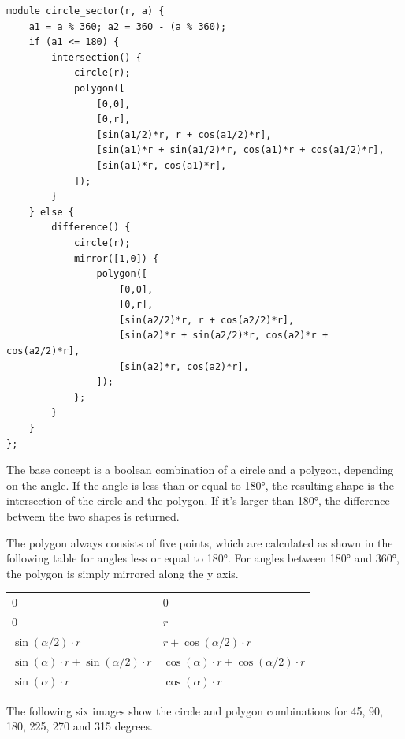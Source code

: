 \vspace{.5\baselineskip}
\begin{verbatim}
module circle_sector(r, a) {
    a1 = a % 360; a2 = 360 - (a % 360);
    if (a1 <= 180) {
        intersection() {
            circle(r);
            polygon([
                [0,0],
                [0,r],
                [sin(a1/2)*r, r + cos(a1/2)*r],
                [sin(a1)*r + sin(a1/2)*r, cos(a1)*r + cos(a1/2)*r],
                [sin(a1)*r, cos(a1)*r],
            ]);
        }
    } else {
        difference() {
            circle(r);
            mirror([1,0]) {
                polygon([
                    [0,0],
                    [0,r],
                    [sin(a2/2)*r, r + cos(a2/2)*r],
                    [sin(a2)*r + sin(a2/2)*r, cos(a2)*r + cos(a2/2)*r],
                    [sin(a2)*r, cos(a2)*r],
                ]);
            };
        }
    }
};
\end{verbatim}

\noindent The base concept is a boolean combination of a circle and a polygon,
depending on the angle. If the angle is less than or equal to 180\si{\degree},
the resulting shape is the intersection of the circle and the polygon. If it's
larger than 180\si{\degree}, the difference between the two shapes is returned.

The polygon always consists of five points, which are calculated as shown in the
following table for angles less or equal to 180\si{\degree}. For angles between
180\si{\degree} and 360\si{\degree}, the polygon is simply mirrored along the y
axis.

\begin{table}[H]
	\centering
	\begin{tabularx}{\textwidth}{XX} \toprule
		\tableheadline{x} & \tableheadline{y} \\
		\midrule
		$0$ & $0$ \\
		$0$ & $r$ \\
		$\sin(\alpha / 2) \cdot r$ & $r + \cos(\alpha / 2) \cdot r$ \\
		$\sin(\alpha) \cdot r + \sin(\alpha / 2) \cdot r$ & $\cos(\alpha) \cdot r + \cos(\alpha / 2) \cdot r$ \\
		$\sin(\alpha) \cdot r$ & $\cos(\alpha) \cdot r$ \\
		\bottomrule
	\end{tabularx}
\end{table}

\noindent The following six images show the circle and polygon combinations for
45, 90, 180, 225, 270 and 315 degrees.

